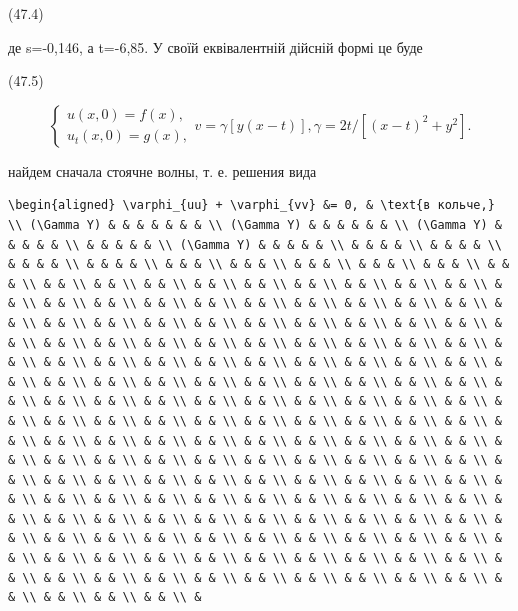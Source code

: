 \documentclass[
  ukrainian,
]{article}
\begin{document}
(47.4)

де s=-0,146, а t=-6,85. У своїй еквівалентній дійсній формі це буде

(47.5)

\[
\begin{cases} u(x, 0) = f(x), \\ u_t(x, 0) = g(x), \end{cases}
v = \gamma [y(x-t)],
\gamma = 2t/[(x-t)^2 + y^2].
\]

найдем сначала стоячне волны, т. е. решения вида

\begin{verbatim}
\begin{aligned} \varphi_{uu} + \varphi_{vv} &= 0, & \text{в кольче,} \\ (\Gamma Y) & & & & & & & \\ (\Gamma Y) & & & & & & \\ (\Gamma Y) & & & & & \\ & & & & & \\ (\Gamma Y) & & & & & \\ & & & & \\ & & & & \\ & & & & \\ & & & & \\ & & & \\ & & & \\ & & & \\ & & & \\ & & & \\ & & & \\ & & \\ & & \\ & & \\ & & \\ & & \\ & & \\ & & \\ & & \\ & & \\ & & \\ & & \\ & & \\ & & \\ & & \\ & & \\ & & \\ & & \\ & & \\ & & \\ & & \\ & & \\ & & \\ & & \\ & & \\ & & \\ & & \\ & & \\ & & \\ & & \\ & & \\ & & \\ & & \\ & & \\ & & \\ & & \\ & & \\ & & \\ & & \\ & & \\ & & \\ & & \\ & & \\ & & \\ & & \\ & & \\ & & \\ & & \\ & & \\ & & \\ & & \\ & & \\ & & \\ & & \\ & & \\ & & \\ & & \\ & & \\ & & \\ & & \\ & & \\ & & \\ & & \\ & & \\ & & \\ & & \\ & & \\ & & \\ & & \\ & & \\ & & \\ & & \\ & & \\ & & \\ & & \\ & & \\ & & \\ & & \\ & & \\ & & \\ & & \\ & & \\ & & \\ & & \\ & & \\ & & \\ & & \\ & & \\ & & \\ & & \\ & & \\ & & \\ & & \\ & & \\ & & \\ & & \\ & & \\ & & \\ & & \\ & & \\ & & \\ & & \\ & & \\ & & \\ & & \\ & & \\ & & \\ & & \\ & & \\ & & \\ & & \\ & & \\ & & \\ & & \\ & & \\ & & \\ & & \\ & & \\ & & \\ & & \\ & & \\ & & \\ & & \\ & & \\ & & \\ & & \\ & & \\ & & \\ & & \\ & & \\ & & \\ & & \\ & & \\ & & \\ & & \\ & & \\ & & \\ & & \\ & & \\ & & \\ & & \\ & & \\ & & \\ & & \\ & & \\ & & \\ & & \\ & & \\ & & \\ & & \\ & & \\ & & \\ & & \\ & & \\ & & \\ & & \\ & & \\ & & \\ & & \\ & & \\ & & \\ & & \\ & & \\ & & \\ & 
\end{verbatim}
\end{document}
